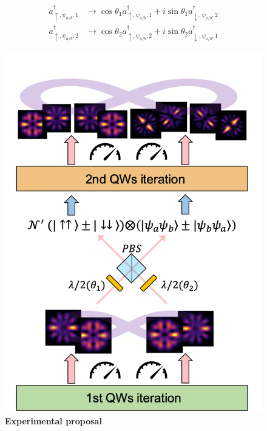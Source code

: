 \documentclass[
	aps, pra,
	superscriptaddress, twocolumn,
	floatfix,
	10pt
]{revtex4-1}
\begin{document}
\begin{equation}\begin{aligned}
    a^{\dagger}_{\uparrow, \psi_{a/b},1} & \rightarrow \cos{\theta_1}a^{\dagger}_{\uparrow, \psi_{a/b},1} + i\sin{\theta_1}a^{\dagger}_{\downarrow, \psi_{a/b},2} \\
    a^{\dagger}_{\uparrow, \psi_{a/b},2} & \rightarrow \cos{\theta_2}a^{\dagger}_{\uparrow, \psi_{a/b},2} + i\sin{\theta_2}a^{\dagger}_{\downarrow, \psi_{a/b},1}
\end{aligned}\end{equation}

\begin{figure}[t]
    \centering
    \includegraphics[scale= 0.45]{figures/conceptual_fig_2.png}
    \caption{\textbf{Experimental proposal}}
    \label{fig:conceptual_fig_2}
\end{figure}
\end{document}

